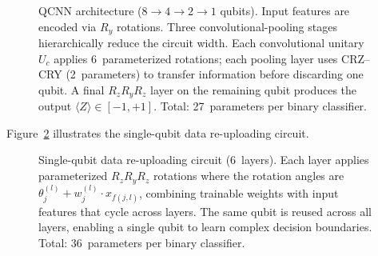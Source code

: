 \documentclass[twoside,openany,a4paper,11pt,english]{report}
\begin{document}
\begin{figure}[ht]
\caption{QCNN architecture ($8 \to 4 \to 2 \to 1$ qubits). Input features are encoded via $R_y$ rotations. Three convolutional-pooling stages hierarchically reduce the circuit width. Each convolutional unitary $U_c$ applies 6~parameterized rotations; each pooling layer uses CRZ--CRY (2~parameters) to transfer information before discarding one qubit. A final $R_z R_y R_z$ layer on the remaining qubit produces the output $\langle Z \rangle \in [-1, +1]$. Total: 27~parameters per binary classifier.}
\label{fig:qcnn_circuit}
\end{figure}

Figure~\ref{fig:reup_circuit} illustrates the single-qubit data re-uploading circuit.

\begin{figure}[ht]
\centering
{}
\caption{Single-qubit data re-uploading circuit (6~layers). Each layer applies parameterized $R_z R_y R_z$ rotations where the rotation angles are $\theta_j^{(l)} + w_j^{(l)} \cdot x_{f(j,l)}$, combining trainable weights with input features that cycle across layers. The same qubit is reused across all layers, enabling a single qubit to learn complex decision boundaries. Total: 36~parameters per binary classifier.}
\label{fig:reup_circuit}
\end{figure}
\end{document}
